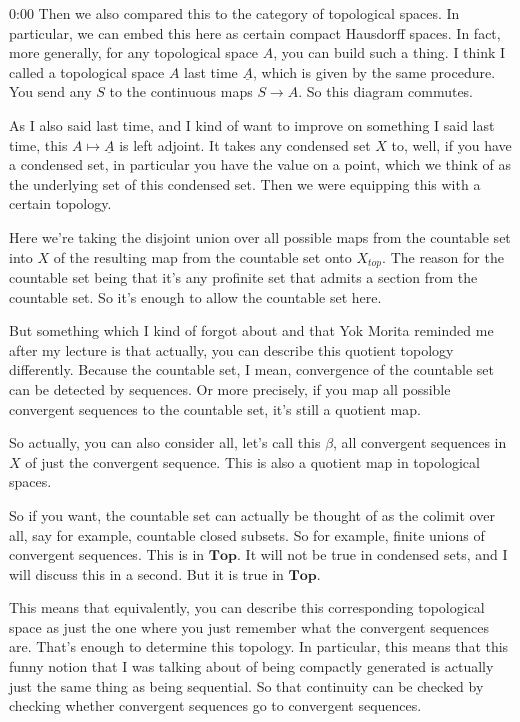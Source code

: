 \begin{unfinished}{0:00}
Then we also compared this to the category of topological spaces. In particular, we can embed this here as certain compact Hausdorff spaces. In fact, more generally, for any topological space $A$, you can build such a thing. I think I called a topological space $A$ last time $\underline{A}$, which is given by the same procedure. You send any $S$ to the continuous maps  $S \to A$. So this diagram commutes.

As I also said last time, and I kind of want to improve on something I said last time, this $A\mapsto \underline{A}$ is left adjoint. It takes any condensed set $X$ to, well, if you have a condensed set, in particular you have the value on a point, which we think of as the underlying set of this condensed set. Then we were equipping this with a certain topology.

Here we're taking the disjoint union over all possible maps from the countable set into $X$ of the resulting map from the countable set onto $X_{top}$. The reason for the countable set being that it's any profinite set that admits a section from the countable set. So it's enough to allow the countable set here.

But something which I kind of forgot about and that Yok Morita reminded me after my lecture is that actually, you can describe this quotient topology differently. Because the countable set, I mean, convergence of the countable set can be detected by sequences. Or more precisely, if you map all possible convergent sequences to the countable set, it's still a quotient map.

So actually, you can also consider all, let's call this $\beta$, all convergent sequences in $X$ of just the convergent sequence. This is also a quotient map in topological spaces.

So if you want, the countable set can actually be thought of as the colimit over all, say for example, countable closed subsets. So for example, finite unions of convergent sequences. This is in $\mathbf{Top}$. It will not be true in condensed sets, and I will discuss this in a second. But it is true in $\mathbf{Top}$.

This means that equivalently, you can describe this corresponding topological space as just the one where you just remember what the convergent sequences are. That's enough to determine this topology. In particular, this means that this funny notion that I was talking about of being compactly generated is actually just the same thing as being sequential. So that continuity can be checked by checking whether convergent sequences go to convergent sequences.


\end{unfinished}
